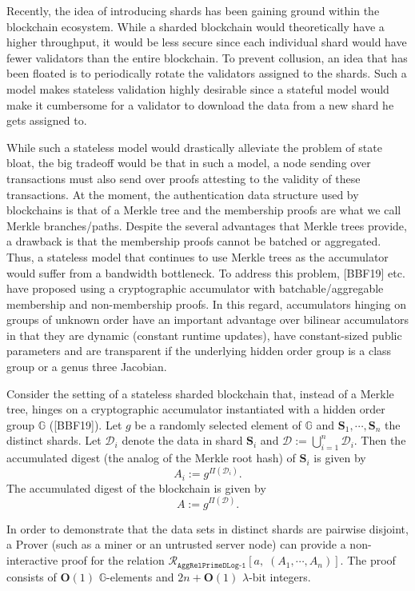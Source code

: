 \documentclass[11pt, lettersize, notitlepage, leqno, footskip=0.6cm]{article}
\newcommand{\ttt}{\texttt}
\newcommand{\bG}{\mathbb{G}}
\newcommand{\mc}{\mathcal}
\newcommand{\mb}{\mathbb}
\newcommand{\mbf}{\mathbf}
\newcommand{\lam}{\lambda}
\newcommand{\bO}{\mbf{O}}
\newcommand{\vs}{\vspace{-0.15cm}}
\numberwithin{equation}{section}
\begin{document}
Recently, the idea of introducing shards has been gaining ground within the blockchain ecosystem. While a sharded blockchain would theoretically have a higher throughput, it would be less secure since each individual shard would have fewer validators than the entire blockchain. To prevent collusion, an idea that has been floated is to periodically rotate the validators assigned to the shards. Such a model makes stateless validation highly desirable since a stateful model would make it cumbersome for a validator to download the data from a new shard he gets assigned to.

While such a stateless model would drastically alleviate the problem of state bloat, the big tradeoff would be that in such a model, a node sending over transactions must also send over proofs attesting to the validity of these transactions. At the moment, the authentication data structure used by blockchains is that of a Merkle tree and the membership proofs are what we call Merkle branches/paths. Despite the several advantages that Merkle trees provide, a drawback is that the membership proofs cannot be batched or aggregated. Thus, a stateless model that continues to use Merkle trees as the accumulator would suffer from a bandwidth bottleneck. To address this problem, [BBF19] etc. have proposed using a cryptographic accumulator with batchable/aggregable membership and non-membership proofs. In this regard, accumulators hinging on groups of unknown order have an important advantage over bilinear accumulators in that they are dynamic (constant runtime updates), have constant-sized public parameters and are transparent if the underlying hidden order group is a class group or a genus three Jacobian.

Consider the setting of a stateless sharded blockchain that, instead of a Merkle tree, hinges on a cryptographic accumulator instantiated with a hidden order group $\mb{G}$ ([BBF19]). Let $g$ be a randomly selected element of $\mb{G}$ and $\mbf{S}_1,\cdots, \mbf{S}_n$ the distinct shards. Let $\mc{D}_i$ denote the data in shard $\mbf{S}_i$ and $\mc{D}:= \bigcup\limits_{i=1}^n \mc{D}_i$. Then the accumulated digest (the analog of the Merkle root hash) of $\mbf{S}_i$ is given by \vs $$A_i:= g^{\Pi(\mc{D}_i)}.$$  The accumulated digest of the blockchain is given by \vs $$A:= g^{\Pi(\mc{D})}.$$

In order to demonstrate that the data sets in distinct shards are pairwise disjoint, a Prover (such as a miner or an untrusted server node) can provide a non-interactive proof for the relation $\mc{R}_{\ttt{AggRelPrimeDLog-1}}[a,\;(A_1,\cdots,A_n) ].$ The proof consists of $\bO(1)$ $\bG$-elements and $2n+\bO(1)$ $\lam$-bit integers.
\end{document}
